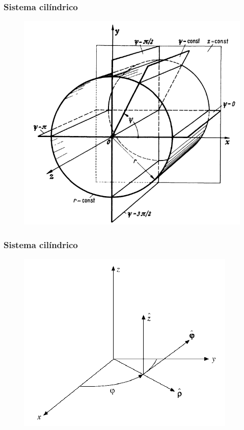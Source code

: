 \documentclass[12pt]{beamer}
\begin{document}
\begin{frame}
\frametitle{Sistema cilíndrico}
\begin{figure}
  \centering
  \includegraphics[scale=1.2]{Imagenes/Planos_Coordenadas_Cilindricas.png}
\end{figure}
\end{frame}
\begin{frame}
\frametitle{Sistema cilíndrico}
\begin{figure}
  \centering
 \includegraphics[scale=0.5]{Imagenes/CoordenadasCilindricas_Vector_Unitario.png}
\end{figure}
\end{frame}
\end{document}
